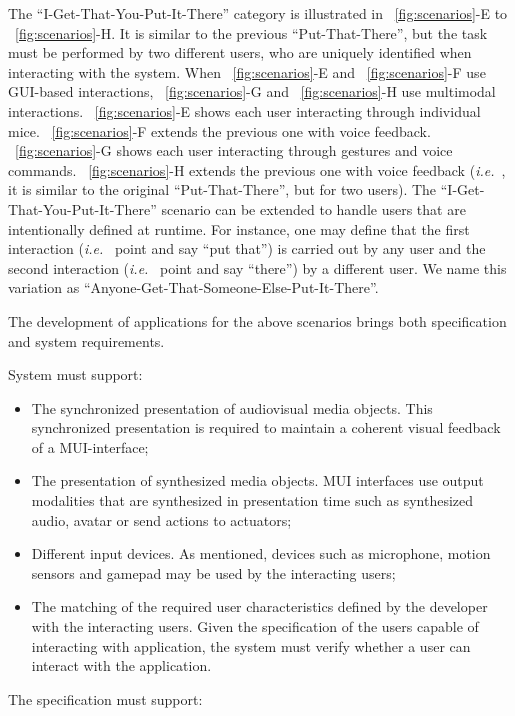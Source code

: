 \documentclass[
  doutorado,
  american
]{ThesisPUC}
\newcommand{\fig}[1]{\figurename~\ref{#1}}
\begin{document}
The “I-Get-That-You-Put-It-There” category is illustrated in
\fig{fig:scenarios}-E to \fig{fig:scenarios}-H. It is similar to the previous
“Put-That-There”, but the task must be performed by two different users, who are
uniquely identified when interacting with the system. When \fig{fig:scenarios}-E
and \fig{fig:scenarios}-F use GUI-based interactions, \fig{fig:scenarios}-G and
\fig{fig:scenarios}-H use multimodal interactions. \fig{fig:scenarios}-E shows
each user interacting through individual mice. \fig{fig:scenarios}-F extends the
previous one with voice feedback. \fig{fig:scenarios}-G shows each user
interacting through gestures and voice commands. \fig{fig:scenarios}-H extends
the previous one with voice feedback (\textit{i.e.}~, it is similar to the original
“Put-That-There”, but for two users). The “I-Get-That-You-Put-It-There” scenario
can be extended to handle users that are intentionally defined at runtime. For
instance, one may define that the first interaction (\textit{i.e.}~ point and 
say “put that”) is carried out by any user and the second interaction 
(\textit{i.e.}~ point and say “there”) by a different user. We name this variation as “Anyone-Get-That-Someone-Else-Put-It-There”.

The development of applications for the above scenarios brings both
specification and system requirements.

System must support:

\begin{itemize}	
	\item The synchronized presentation of audiovisual media objects. This
	synchronized presentation is required to maintain a coherent visual feedback
	of a MUI-interface;
	\item The presentation of synthesized media objects. MUI interfaces use output
	modalities that are synthesized in presentation time such as synthesized
	audio, avatar or send actions to actuators;
	\item Different input devices. As mentioned, devices such as microphone,
	motion sensors and gamepad may be used by the interacting users;
	\item The matching of the required user characteristics defined by the
	developer with the interacting users. Given the specification of the users
	capable of interacting with application, the system must verify whether a user
	can interact with the application.
\end{itemize}

The specification must support:
\end{document}
